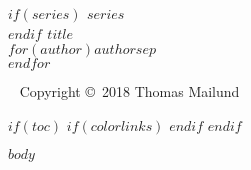 \documentclass[11pt,twoside,openright]{memoir}
\begin{document}

\begingroup
\thispagestyle{empty}
{\bfseries\sffamily\noindent
$if(series)$ {\Large $series$}\\[50pt]$endif$ %
{\huge $title$}\\[35pt] %
{\huge $for(author)$$author$$sep$\\$endfor$} %
}
\vfill
\endgroup



\newpage
~\vfill
\thispagestyle{empty}
\noindent Copyright \copyright\ 2018 Thomas Mailund\\ %
\clearpage


$if(toc)$
$if(colorlinks)$
\hypersetup{linkcolor=$if(toccolor)$$toccolor$$else$black$endif$}
$endif$
\setcounter{tocdepth}{1}
\pagestyle{empty} %
\tableofcontents %
\cleardoublepage %
$endif$



\pagestyle{Ruled}
$body$

\end{document}
